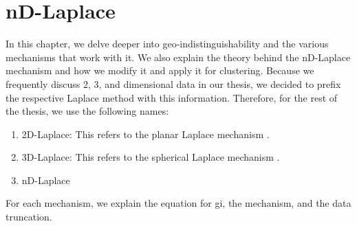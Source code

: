 \chapter{nD-Laplace}
In this chapter, we delve deeper into geo-indistinguishability and the various mechanisms that work with it.
We also explain the theory behind the nD-Laplace mechanism and how we modify it and apply it for clustering.
Because we frequently discuss 2, 3, and dimensional data in our thesis, we decided to prefix the respective Laplace method with this information.
Therefore, for the rest of the thesis, we use the following names:
\begin{enumerate}
  \item 2D-Laplace: This refers to the planar Laplace mechanism \citep{DBLP:journals/corr/abs-1212-1984}.
  \item 3D-Laplace: This refers to the spherical Laplace mechanism \citep{9646489}.
  \item nD-Laplace
\end{enumerate}
For each mechanism, we explain the equation for \gls{gi}, the mechanism, and the data truncation.

\printnomenclature



\newpage

